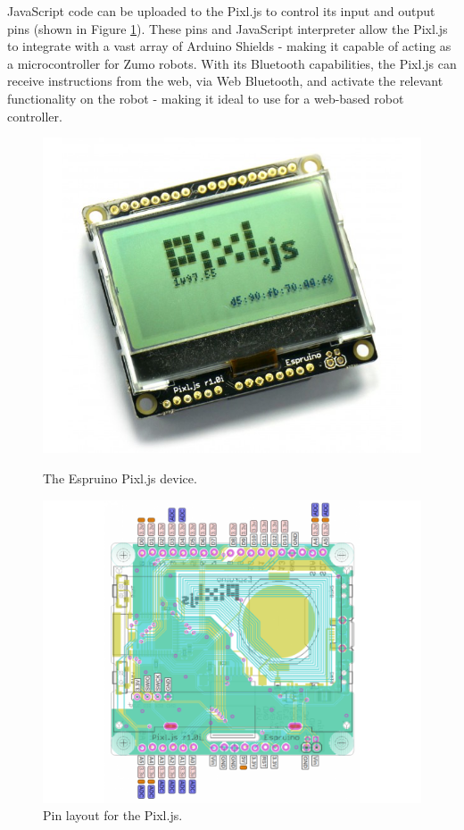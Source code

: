 \documentclass{l4proj}
\begin{document}
JavaScript code can be uploaded to the Pixl.js to control its input and output pins (shown in Figure \ref{fig:pixljs-pinout}). These pins and JavaScript interpreter allow the Pixl.js to integrate with a vast array of Arduino Shields - making it capable of acting as a microcontroller for Zumo robots. With its Bluetooth capabilities, the Pixl.js can receive instructions from the web, via Web Bluetooth, and activate the relevant functionality on the robot - making it ideal to use for a web-based robot controller.

\begin{figure}[h!]
    \centering
    \begin{minipage}[b]{0.43\textwidth}
        \includegraphics[width=\textwidth]{images/pixljs.jpeg}
        \caption{The Espruino Pixl.js device.}
        \label{fig:pixljs}
    \end{minipage}
    \begin{minipage}[b]{0.50\textwidth}
        \includegraphics[width=\textwidth]{images/pixljs-pinout.png}
        \caption{Pin layout for the Pixl.js.}
        \label{fig:pixljs-pinout}
    \end{minipage}
\end{figure}
\end{document}
